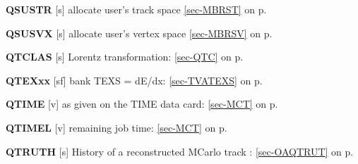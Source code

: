  \item{\bf QSUSTR  }[s] allocate user's track space \ref{sec-MBRST} on p.~\pageref{sec-MBRST}\\
 \item{\bf QSUSVX  }[s] allocate user's vertex space \ref{sec-MBRSV} on p.~\pageref{sec-MBRSV}
 
 \item{\bf QTCLAS  }[s] Lorentz transformation: \ref{sec-QTC} on p.~\pageref{sec-QTC}\\
 \item{\bf QTEXxx  }[sf] bank TEXS = dE/dx: \ref{sec-TVATEXS} on p.~\pageref{sec-TVATEXS}\\
 \item{\bf QTIME   }[v] as given on the TIME data card: \ref{sec-MCT} on p.~\pageref{sec-MCT}\\
 \item{\bf QTIMEL  }[v] remaining job time: \ref{sec-MCT} on p.~\pageref{sec-MCT}\\
 \item{\bf QTRUTH  }[s] History of a reconstructed MCarlo track : \ref{sec-OAQTRUT} on p.~\pageref{sec-OAQTRUT}
 
